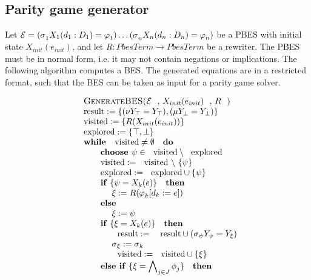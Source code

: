 \documentclass{article}
\begin{document}
\subsection{Parity game generator}

Let $\mathcal{E=(\sigma }_{1}X_{1}(d_{1}:D_{1})=\varphi _{1})\ldots \mathcal{%
(\sigma }_{n}X_{n}(d_{n}:D_{n})=\varphi _{n})$ be a PBES with initial state $%
X_{init}(e_{init})$, and let $R:PbesTerm\rightarrow PbesTerm$ be a rewriter.
The PBES must be in normal form, i.e. it may not contain negations or
implications. The following algorithm computes a BES. The generated
equations are in a restricted format, such that the BES can be taken as
input for a parity game solver.

{\small
\begin{equation*}
\begin{array}{l}
\text{\textsc{GenerateBES(}}\mathcal{E}\text{, }X_{init}(e_{init})\text{, }R%
\text{\textsc{)}} \\
\text{result}:=\{(\nu Y_{\top }=Y_{\top }),(\mu Y_{\bot }=Y_{\bot })\} \\
\text{visited}:=\{R(X_{init}(e_{init}))\} \\
\text{explored}:=\{\top ,\bot \} \\
\text{\textbf{while }}\text{visited}\neq \emptyset \text{ \textbf{do}} \\
\qquad \text{\textbf{choose }}\psi \in \text{visited}\setminus \text{explored%
} \\
\qquad \text{visited}:=\text{visited}\ \backslash \ \{\psi \} \\
\qquad \text{explored}:=\text{explored}\cup \{\psi \} \\
\qquad \text{\textbf{if} }\{\psi =X_{k}(e)\}\text{ \textbf{then}} \\
\qquad \qquad \xi :=R(\varphi _{k}[d_{k}:=e]) \\
\qquad \text{\textbf{else}} \\
\qquad \qquad \xi :=\psi  \\
\qquad \text{\textbf{if} }\{\xi =X_{k}(e)\}\text{ \textbf{then}} \\
\qquad \qquad \text{result}:=\text{ result}\cup (\sigma _{\psi }Y_{\psi
}=Y_{\xi }) \\
\qquad \qquad \sigma _{\xi }:=\sigma _{k} \\
\qquad \qquad \text{visited}:=\text{visited}\cup \{\xi \} \\
\qquad \text{\textbf{else if} }\{\xi =\dbigwedge_{j\in J}\phi _{j}\}\text{
\textbf{then}} \\

\end{array}
\end{equation*}}
\end{document}

